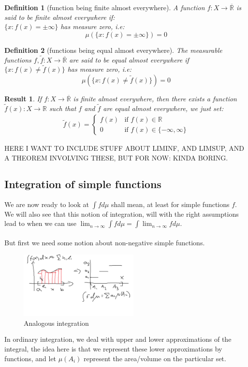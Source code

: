\documentclass{article}
\newcommand{\R}{\mathbb{R}}
\newcommand{\Rbar}{\overline{\mathbb{R}}}%
\newtheorem{definition}{Definition}
\newtheorem{result}{Result}
\begin{document}
\begin{definition}[function being finite almost everywhere]
A function $f:X\to \Rbar$ is said to be finite almost everywhere if: \\ 
$\{x: f(x) = \pm \infty \}$ has measure zero, i.e: 
\[\mu(\{x: f(x) = \pm \infty \}) = 0
\]
\end{definition}

\begin{definition}[functions being equal almost everywhere]
The measurable functions $f, \widetilde{f}:X \to \Rbar$ are said to be equal almost everywhere if $\{x: f(x) \neq \widetilde{f}(x) \}$ has measure zero, i.e: 
\[\mu(\{x: f(x) \neq \widetilde{f}(x) \}) = 0
\]
\end{definition}

\begin{result}
If $f:X\to \Rbar$ is finite almost everywhere, then there exists a function $\widetilde{f}(x):X\to \R$ such that $f$ and $\widetilde{f}$ are equal almost everywhere, we just set: 
\begin{align*}
    \widetilde{f}(x) =
    \begin{cases}
      f(x) & \text{if $f(x)\in \R$} \\ 
      0 & \text{if $f(x)\in \{-\infty, \infty\}$}
    \end{cases}
\end{align*}
\end{result} 

HERE I WANT TO INCLUDE STUFF ABOUT LIMINF, AND LIMSUP, AND A THEOREM INVOLVING THESE, BUT FOR NOW: KINDA BORING. 


\subsection{Integration of simple functions}
We are now ready to look at $\int fd\mu$ shall mean, at least for simple functions $f$. We will also see that this notion of integration, will with the right assumptions lead to when we can use $\lim_{n\to \infty}\int fd\mu = \int \lim_{n\to \infty} fd\mu$. 
\\~\\ 
But first we need some notion about non-negative simple functions. 

\begin{figure}[h]
\includegraphics[width=6cm]{Analougus integration.png}
\centering
\caption{Analogous integration}
\label{fig:analogus integration}
\end{figure}
In ordinary integration, we deal with upper and lower approximations of the integral, the idea here is that we represent these lower approximations by functions, and let $\mu(A_{i})$ represent the area/volume on the particular set. 
\end{document}
